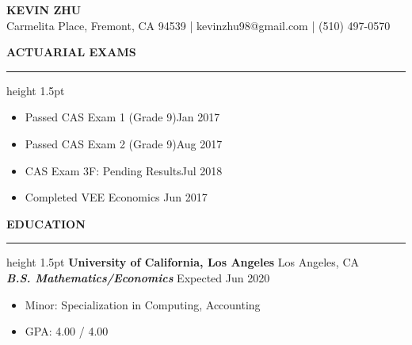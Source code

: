 \documentclass[11pt,letterpaper]{article}
\newcommand{\sectline}{\vspace{4pt}\hrule height 1.5pt\vspace{4pt}}
\newcommand{\sectspace}{\vspace{9pt}}
\begin{document}
\centering
{\fontsize{13pt}{13pt}\selectfont \textbf{KEVIN ZHU}} \vspace{2pt} \\
{\fontsize{12pt}{13pt} Carmelita Place, Fremont, CA 94539 | kevinzhu98@gmail.com | (510) 497-0570}
\sectspace

\fontsize{11pt}{13pt}\selectfont
\raggedright
\textbf{ACTUARIAL EXAMS}\sectline
\begin{itemize}
	\item Passed CAS Exam 1 (Grade 9)\hfill Jan 2017
	\item Passed CAS Exam 2 (Grade 9)\hfill Aug 2017
	\item CAS Exam 3F: Pending Results\hfill Jul 2018
	\item Completed VEE Economics \hfill Jun 2017
\end{itemize}
\sectspace


\textbf{EDUCATION}\sectline
\textbf{University of California, Los Angeles} \hfill Los Angeles, CA \\
\textbf{\textit{B.S. Mathematics/Economics}} \hfill Expected Jun 2020 
\begin{itemize}
	\item Minor: Specialization in Computing, Accounting
	\item GPA: 4.00 / 4.00
\end{itemize}
\sectspace
\end{document}
